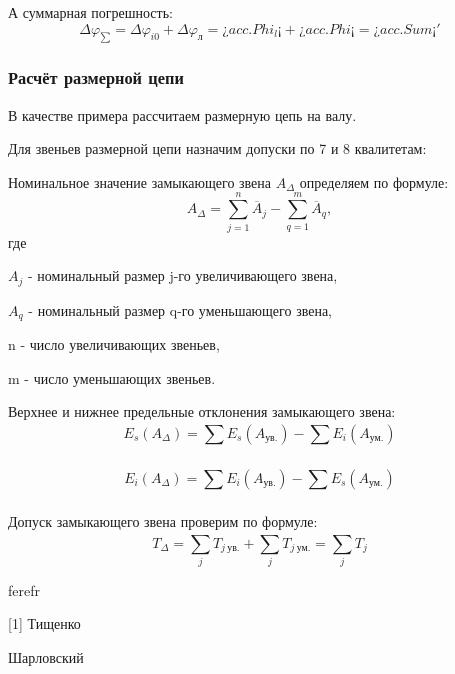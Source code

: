 \documentclass[14pt,a4paper,russian]{scrartcl}
\begin{document}
        А суммарная погрешность:
        \[ \Delta\varphi_{\sum} = \Delta\varphi_{i0}  + \Delta\varphi_{\text{л}} 
        = ¿acc.Phi_l¡ + ¿acc.Phi¡ = ¿acc.Sum¡' \]

    
    \subsubsection{Расчёт размерной цепи}
        В качестве примера рассчитаем размерную цепь на валу. 

        
        
        Для звеньев размерной цепи назначим допуски по 7 и 8 квалитетам:

        Номинальное значение замыкающего звена \( A_\Delta \) определяем 
        по формуле:
        \[ A_\Delta = \sum_{j=1}^{n}\overline{A}_j - 
            \sum_{q=1}^{m}\overline{A}_q, \]
        где\par
        \qquad \( A_j \) - номинальный размер j-го увеличивающего звена,\par 
        \qquad \( A_q \) - номинальный размер q-го уменьшающего звена,\par
        \qquad n - число увеличивающих звеньев,\par 
        \qquad m - число уменьшающих звеньев.\par

        Верхнее и нижнее предельные отклонения замыкающего звена:
        \[ E_s(A_\Delta) = \sum_{}^{}E_s(A_{\text{ув.}}) - \sum_{}^{}E_i(A_{\text{ум.}}) \]

        \[ E_i(A_\Delta) = \sum_{}^{}E_i(A_{\text{ув.}}) - \sum_{}^{}E_s(A_{\text{ум.}}) \]

        Допуск замыкающего звена проверим по формуле:
        \[ T_\Delta = \sum_{j}^{}T_{j\ \text{ув.}} + \sum_{j}^{}T_{j\ \text{ум.}} = \sum_{j}^{}T_j \]
        
        
        
        

        
        
        
        
        
        
        
        

        
        
\newpage
        ferefr
\renewcommand\refname{Список использованных источников}

        
[1] Тищенко \par
[2] Шарловский
    
\end{document}
